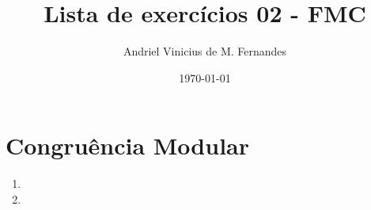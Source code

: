 \documentclass[12pt]{article}
\title{Lista de exercícios 02 - FMC}
\author{Andriel Vinicius de M. Fernandes}
\date{\today}
\begin{document}
\maketitle
\section{Congruência Modular}
\begin{enumerate}
	\item 
	\item 
\end{enumerate}
\end{document}
